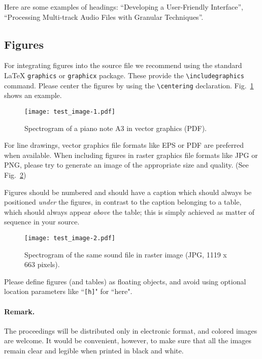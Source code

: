 \documentclass[runningheads,a4paper]{llncs}
\begin{document}
Here are some examples of headings: ``Developing a User-Friendly
Interface'', ``Processing Multi-track Audio Files with Granular Techniques''.

\subsection{Figures}

For integrating figures into the source file we recommend using the
standard \LaTeX{} \verb+graphics+ or \verb+graphicx+ package. These provide
the \verb+\includegraphics+ command. Please center the figures by using the
\verb+\centering+ declaration. Fig.~\ref{fig:example_1} shows an example.

\begin{figure}
\centering
\texttt{[image: test\_image-1.pdf]}
\caption{Spectrogram of a piano note A3 in vector graphics (PDF).}
\label{fig:example_1}
\end{figure}

For line drawings, vector graphics file formats like EPS or PDF are preferred
when available. When including figures in raster graphics file formats like
JPG or PNG, please try to generate an image of the appropriate size and
quality. (See Fig.~\ref{fig:example_2})

Figures should be numbered and should have a caption which should always be
positioned \emph{under} the figures, in contrast to the caption belonging
to a table, which should always appear \emph{above} the table; this is
simply achieved as matter of sequence in your source.

\begin{figure}
\centering
\texttt{[image: test\_image-2.pdf]}
\caption{Spectrogram of the same sound file in raster image (JPG,
1119 x  663 pixels).}
\label{fig:example_2}
\end{figure}

Please define figures (and tables) as floating objects, and avoid using
optional location parameters like ``\verb+[h]+" for ``here".

\paragraph{Remark.}

The proceedings will be distributed only in electronic format, and colored
images are welcome. It would be convenient, however, to make sure that all
the images remain clear and legible when printed in black and white.
\end{document}
